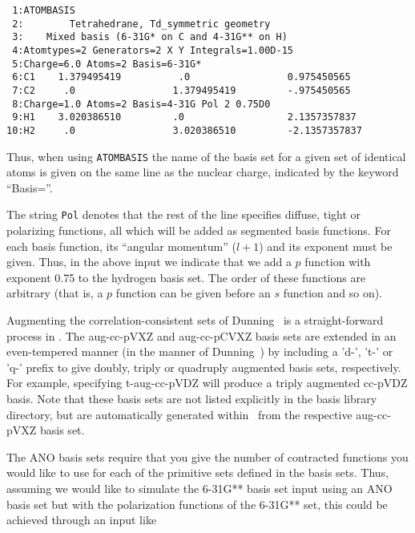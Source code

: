\begin{verbatim}
 1:ATOMBASIS
 2:        Tetrahedrane, Td_symmetric geometry
 3:    Mixed basis (6-31G* on C and 4-31G** on H)
 4:Atomtypes=2 Generators=2 X Y Integrals=1.00D-15
 5:Charge=6.0 Atoms=2 Basis=6-31G*
 6:C1    1.379495419          .0                 0.975450565
 7:C2     .0                 1.379495419         -.975450565
 8:Charge=1.0 Atoms=2 Basis=4-31G Pol 2 0.75D0
 9:H1    3.020386510         .0                  2.1357357837
10:H2     .0                 3.020386510         -2.1357357837
\end{verbatim}


Thus, when using {\tt ATOMBASIS} the name of the
basis set for a given
set of identical atoms is given on the same line as the nuclear
charge, indicated by the keyword ``Basis=''.

The string {\tt Pol} denotes that the rest of the line specifies
diffuse, tight or polarizing
functions, all which will be added as segmented basis functions.
For each basis function, its ``angular momentum'' ($l+1$) and its
exponent must be given. Thus, in the above input we indicate that
we add a $p$ function with exponent 0.75 to the hydrogen basis
set. The order of these functions are arbitrary (that is, a $p$
function can be given before an $s$ function and so on).

Augmenting the correlation-consistent 
sets of Dunning~\cite{dewthdjcp100} is a straight-forward process in \dalton. 
The aug-cc-pVXZ and aug-cc-pCVXZ basis sets are extended in an even-tempered manner 
(in the manner of Dunning~\cite{dewthdjcp100})
by including a 'd-', 't-' or 'q-' prefix to give doubly, triply or quadruply 
augmented basis sets, respectively. For example, specifying t-aug-cc-pVDZ will
produce a triply augmented cc-pVDZ basis.
Note that these basis sets are not listed 
explicitly in the basis library directory, 
but are automatically generated within \dalton\ from the respective 
aug-cc-pVXZ
basis set.

The ANO basis sets require that you give the number of contracted
functions you would like to use for each of the primitive sets defined
in the basis sets. Thus, assuming we would like to simulate the
6-31G** basis set input using an ANO basis set but with the
polarization functions of the 6-31G** set, this could be achieved
through an input like

